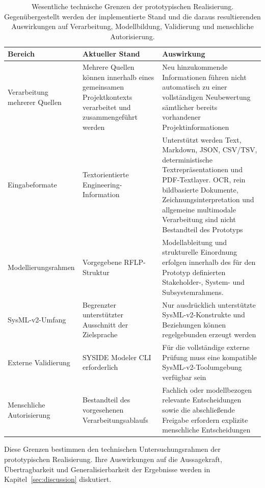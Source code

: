 \begin{table}[H]
    \centering
    \small
    \caption[Technische Grenzen des Prototyps]{
        Wesentliche technische Grenzen der prototypischen Realisierung.
        Gegenübergestellt werden der implementierte Stand und die daraus
        resultierenden Auswirkungen auf Verarbeitung, Modellbildung,
        Validierung und menschliche Autorisierung.}
    \label{tab:implementation_limits}
    \begin{tabular}{p{3.3cm}p{4.2cm}p{6.2cm}}
        \hline
        \textbf{Bereich} &
        \textbf{Aktueller Stand} &
        \textbf{Auswirkung} \\
        \hline

        Verarbeitung mehrerer Quellen &
        Mehrere Quellen können innerhalb eines gemeinsamen
        Projektkontexts verarbeitet und zusammengeführt werden &
        Neu hinzukommende Informationen führen nicht automatisch
        zu einer vollständigen Neubewertung sämtlicher bereits
        vorhandener Projektinformationen \\

        Eingabeformate &
        Textorientierte Engineering-Information &
        Unterstützt werden Text, Markdown, JSON, CSV/TSV,
        deterministische Textrepräsentationen und PDF-Textlayer.
        OCR, rein bildbasierte Dokumente, Zeichnungsinterpretation
        und allgemeine multimodale Verarbeitung sind nicht
        Bestandteil des Prototyps \\

        Modellierungsrahmen &
        Vorgegebene RFLP-Struktur &
        Modellableitung und strukturelle Einordnung erfolgen
        innerhalb des für den Prototyp definierten
        Stakeholder-, System- und Subsystemrahmens. \\

        SysML-v2-Umfang &
        Begrenzter unterstützter Ausschnitt der Zielsprache &
        Nur ausdrücklich unterstützte SysML-v2-Konstrukte und
        Beziehungen können regelgebunden erzeugt werden \\

        Externe Validierung &
        SYSIDE Modeler CLI erforderlich &
        Für die vollständige externe Prüfung muss eine kompatible
        SysML-v2-Toolumgebung verfügbar sein \\

        Menschliche Autorisierung &
        Bestandteil des vorgesehenen Verarbeitungsablaufs &
        Fachlich oder modellbezogen relevante Entscheidungen sowie
        die abschließende Freigabe erfordern explizite menschliche
        Entscheidungen \\
        \hline
    \end{tabular}
\end{table}

Diese Grenzen bestimmen den technischen Untersuchungsrahmen der
prototypischen Realisierung. Ihre Auswirkungen auf die Aussagekraft,
Übertragbarkeit und Generalisierbarkeit der Ergebnisse werden in
Kapitel~\ref{sec:discussion} diskutiert.